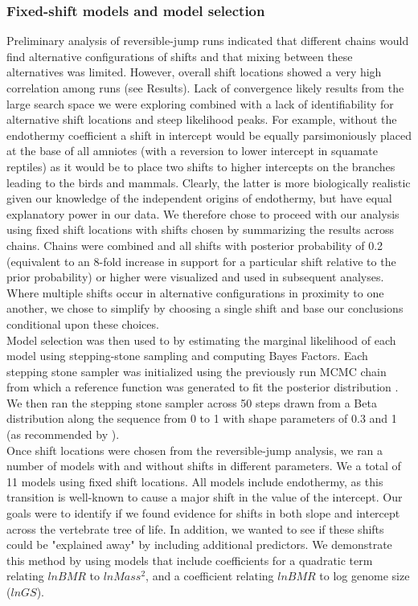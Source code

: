 \documentclass[a4paper,11pt]{article}
\begin{document}
\subsubsection*{Fixed-shift models and model selection} Preliminary analysis of reversible-jump runs indicated that different chains would find alternative configurations of shifts and that mixing between these alternatives was limited. However, overall shift locations showed a very high correlation among runs (see Results). Lack of convergence likely results from the large search space we were exploring combined with a lack of identifiability for alternative shift locations and steep likelihood peaks. For example, without the endothermy coefficient a shift in intercept would be equally parsimoniously placed at the base of all amniotes (with a reversion to lower intercept in squamate reptiles) as it would be to place two shifts to higher intercepts on the branches leading to the birds and mammals. Clearly, the latter is more biologically realistic given our knowledge of the independent origins of endothermy, but have equal explanatory power in our data. We therefore chose to proceed with our analysis using fixed shift locations with shifts chosen by summarizing the results across chains. Chains were combined and all shifts with posterior probability of 0.2 (equivalent to an 8-fold increase in support for a particular shift relative to the prior probability) or higher were visualized and used in subsequent analyses. Where multiple shifts occur in alternative configurations in proximity to one another, we chose to simplify by choosing a single shift and base our conclusions conditional upon these choices. \\

Model selection was then used to by estimating the marginal likelihood of each model using stepping-stone sampling and computing Bayes Factors. Each stepping stone sampler was initialized using the previously run MCMC chain from which a reference function was generated to fit the posterior distribution \citep{Xie2010}. We then ran the stepping stone sampler across 50 steps drawn from a Beta distribution along the sequence from 0 to 1 with shape parameters of 0.3 and 1 (as recommended by \citet{Fan2010}). \\

Once shift locations were chosen from the reversible-jump analysis, we ran a number of models with and without shifts in different parameters. We a total of 11 models using fixed shift locations. All models include endothermy, as this transition is well-known to cause a major shift in the value of the intercept. Our goals were to identify if we found evidence for shifts in both slope and intercept across the vertebrate tree of life. In addition, we wanted to see if these shifts could be "explained away" by including additional predictors. We demonstrate this method by using models that include coefficients for a quadratic term relating $lnBMR$ to $lnMass^2$, and a coefficient relating $lnBMR$ to log genome size ($lnGS$). \\
\end{document}
